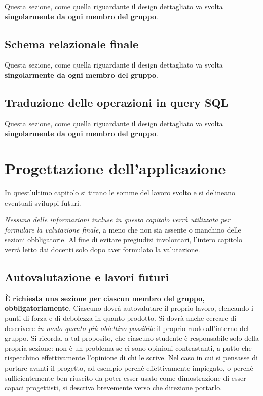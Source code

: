 \documentclass[a4paper,12pt]{report}
\begin{document}
Questa sezione, come quella riguardante il design dettagliato va svolta \textbf{singolarmente da ogni membro del gruppo}.


\section{Schema relazionale finale}

Questa sezione, come quella riguardante il design dettagliato va svolta \textbf{singolarmente da ogni membro del gruppo}.


\section{Traduzione delle operazioni in query SQL}

Questa sezione, come quella riguardante il design dettagliato va svolta \textbf{singolarmente da ogni membro del gruppo}.



\chapter{Progettazione dell'applicazione}

In quest'ultimo capitolo si tirano le somme del lavoro svolto e si delineano eventuali sviluppi
futuri.

\textit{Nessuna delle informazioni incluse in questo capitolo verrà utilizzata per formulare la valutazione finale}, a meno che non sia assente o manchino delle sezioni obbligatorie.
%
Al fine di evitare pregiudizi involontari, l'intero capitolo verrà letto dai docenti solo dopo aver formulato la valutazione.

\section{Autovalutazione e lavori futuri}

\textbf{È richiesta una sezione per ciascun membro del gruppo, obbligatoriamente}.
%
Ciascuno dovrà autovalutare il proprio lavoro, elencando i punti di forza e di debolezza in quanto prodotto.
Si dovrà anche cercare di descrivere \emph{in modo quanto più obiettivo possibile} il proprio ruolo all'interno del gruppo.
Si ricorda, a tal proposito, che ciascuno studente è responsabile solo della propria sezione: non è un problema se ci sono opinioni contrastanti, a patto che rispecchino effettivamente l'opinione di chi le scrive.
Nel caso in cui si pensasse di portare avanti il progetto, ad esempio perché effettivamente impiegato, o perché sufficientemente ben riuscito da poter esser usato come dimostrazione di esser capaci progettisti, si descriva brevemente verso che direzione portarlo.
\end{document}
